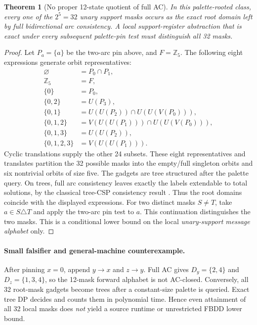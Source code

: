 \documentclass[11pt]{article}
\newtheorem{theorem}{Theorem}
\begin{document}
\begin{theorem}[No proper 12-state quotient of full AC]
In this palette-rooted class, every one of the
\(2^5=32\) unary support masks occurs as the exact
root domain left by full bidirectional arc consistency.
A local support-register abstraction that is exact under every
subsequent palette-pin test must distinguish all 32 masks.
\end{theorem}
\begin{proof}
Let \(P_a=\{a\}\) be the two-arc pin above, and \(F=\mathbb Z_5\).
The following eight expressions generate orbit representatives:
\[
\begin{array}{rl}
\varnothing & =P_0\cap P_1,\\
\mathbb Z_5&=F,\\
\{0\}&=P_0,\\
\{0,2\}&=U(P_3),\\
\{0,1\}&=U(U(P_2))\cap U(U(V(P_0))),\\
\{0,1,2\}&=V(U(U(P_1)))\cap U(U(V(P_0))),\\
\{0,1,3\}&=U(U(P_2)),\\
\{0,1,2,3\}&=V(U(U(P_1))).
\end{array}
\]
Cyclic translations supply the other 24 subsets.
These eight representatives and translates partition the
32 possible masks into the empty/full singleton orbits
and six nontrivial orbits of size five.
The gadgets are tree structured after the palette query.
On trees, full arc consistency leaves exactly the labels
extendable to total solutions, by the classical
tree-CSP consistency result \cite{freuder1982,dechterpearl1987}.
Thus the root domains coincide with the displayed expressions.
For two distinct masks \(S\ne T\), take
\(a\in S\triangle T\) and apply the two-arc
pin test to \(a\). This continuation distinguishes the
two masks. This is a conditional lower bound on the
local \emph{unary-support message alphabet} only.
\end{proof}

\paragraph{Small falsifier and general-machine counterexample.}
After pinning \(x=0\), append \(y\to x\) and
\(z\to y\). Full AC gives \(D_y=\{2,4\}\)
and \(D_z=\{1,3,4\}\), so the 12-mask forward
alphabet is not AC-closed. Conversely, all 32
root-mask gadgets become trees after a constant-size
palette is queried. Exact tree DP decides and counts
them in polynomial time. Hence even attainment of
all 32 local masks does \emph{not} yield a source
runtime or unrestricted FBDD lower bound.
\end{document}
